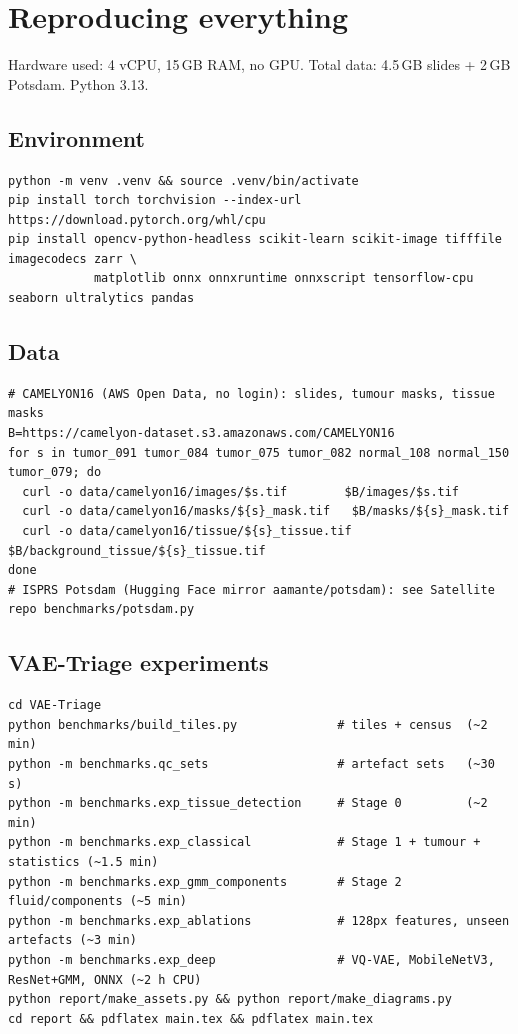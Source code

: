 \chapter{Reproducing everything}
Hardware used: 4 vCPU, 15\,GB RAM, no GPU. Total data: 4.5\,GB slides + 2\,GB Potsdam. Python 3.13.

\section{Environment}
\begin{lstlisting}
python -m venv .venv && source .venv/bin/activate
pip install torch torchvision --index-url https://download.pytorch.org/whl/cpu
pip install opencv-python-headless scikit-learn scikit-image tifffile imagecodecs zarr \
            matplotlib onnx onnxruntime onnxscript tensorflow-cpu seaborn ultralytics pandas
\end{lstlisting}

\section{Data}
\begin{lstlisting}
# CAMELYON16 (AWS Open Data, no login): slides, tumour masks, tissue masks
B=https://camelyon-dataset.s3.amazonaws.com/CAMELYON16
for s in tumor_091 tumor_084 tumor_075 tumor_082 normal_108 normal_150 tumor_079; do
  curl -o data/camelyon16/images/$s.tif        $B/images/$s.tif
  curl -o data/camelyon16/masks/${s}_mask.tif   $B/masks/${s}_mask.tif
  curl -o data/camelyon16/tissue/${s}_tissue.tif $B/background_tissue/${s}_tissue.tif
done
# ISPRS Potsdam (Hugging Face mirror aamante/potsdam): see Satellite repo benchmarks/potsdam.py
\end{lstlisting}

\section{VAE-Triage experiments}
\begin{lstlisting}
cd VAE-Triage
python benchmarks/build_tiles.py              # tiles + census  (~2 min)
python -m benchmarks.qc_sets                  # artefact sets   (~30 s)
python -m benchmarks.exp_tissue_detection     # Stage 0         (~2 min)
python -m benchmarks.exp_classical            # Stage 1 + tumour + statistics (~1.5 min)
python -m benchmarks.exp_gmm_components       # Stage 2 fluid/components (~5 min)
python -m benchmarks.exp_ablations            # 128px features, unseen artefacts (~3 min)
python -m benchmarks.exp_deep                 # VQ-VAE, MobileNetV3, ResNet+GMM, ONNX (~2 h CPU)
python report/make_assets.py && python report/make_diagrams.py
cd report && pdflatex main.tex && pdflatex main.tex
\end{lstlisting}

